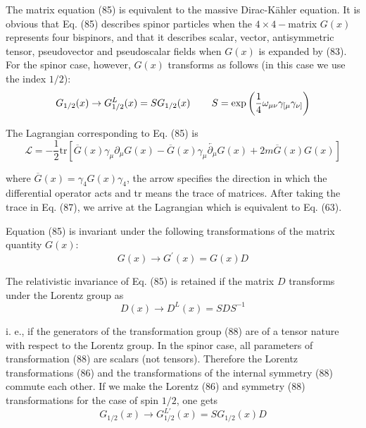 \documentclass[a4paper,12pt]{article}
\begin{document}
The matrix equation (85) is equivalent to the massive
Dirac-K\"ahler equation. It is obvious that Eq. (85) describes
spinor particles when the $ 4\times 4-$matrix $G(x)$ represents
four bispinors, and that it describes scalar, vector,
antisymmetric tensor, pseudovector and pseudoscalar fields when
$G(x)$ is expanded by (83). For the spinor case, however, $G(x)$
transforms as follows (in this case we use the index $1/2$):
\begin{equation}
G_{1/2}(x)\rightarrow G_{1/2}^L(x)=SG_{1/2}(x)\hspace{0.3in}S=\exp \left(
\frac 14\omega _{\mu \nu }\gamma _{[\mu }\gamma _{\nu ]}\right)  \label{86}
\end{equation}

The Lagrangian corresponding to Eq. (85) is
\begin{equation}
\mathcal{L}=-\frac 12\mbox{tr}\left[ \overline{G}(x)\gamma _\mu
\partial _\mu G(x)-\overline{G}(x)\gamma _\mu
\overleftarrow{\partial _\mu }G(x)+2m \overline{G}(x)G(x)\right]
\label{87}
\end{equation}

where $\overline{G}(x)=\gamma _4G(x)\gamma _4$, the arrow specifies the
direction in which the differential operator acts and tr means the trace of
matrices. After taking the trace in Eq. (87), we arrive at the Lagrangian
which is equivalent to Eq. (63).

Equation (85) is invariant under the following transformations of the matrix
quantity $G(x)$:
\begin{equation}
G(x)\rightarrow G^{\prime }(x)=G(x)D  \label{88}
\end{equation}

The relativistic invariance of Eq. (85) is retained if the matrix $D$
transforms under the Lorentz group as
\begin{equation}
D(x)\rightarrow D^L(x)=SDS^{-1}  \label{89}
\end{equation}

i. e., if the generators of the transformation group (88) are of a tensor
nature with respect to the Lorentz group. In the spinor case, all parameters
of transformation (88) are scalars (not tensors). Therefore the Lorentz
transformations (86) and the transformations of the internal symmetry (88)
commute each other. If we make the Lorentz (86) and symmetry (88)
transformations for the case of spin $1/2$, one gets
\begin{equation}
G_{1/2}(x)\rightarrow G_{1/2}^{L\prime }(x)=SG_{1/2}(x)D  \label{90}
\end{equation}
\end{document}
